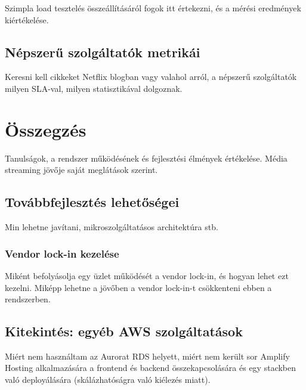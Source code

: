 Szimpla load tesztelés összeállításáról fogok itt értekezni, és a mérési eredmények kiértékelése.

\section{Népszerű szolgáltatók metrikái}

Keresni kell cikkeket Netflix blogban vagy valahol arról, a népszerű szolgáltatók milyen SLA-val, milyen statisztikával dolgoznak.

\chapter{Összegzés}

Tanulságok, a rendszer működésének és fejlesztési élmények értékelése. Média streaming jövője saját meglátások szerint.

\section{Továbbfejlesztés lehetőségei}

Min lehetne javítani, mikroszolgáltatásos architektúra stb.

\subsection{Vendor lock-in kezelése}

Miként befolyásolja egy üzlet működését a vendor lock-in, és hogyan lehet ezt kezelni. Miképp lehetne a jövőben a vendor lock-in-t csökkenteni ebben a rendszerben.

\section{Kitekintés: egyéb AWS szolgáltatások}

Miért nem használtam az Aurorat RDS helyett, miért nem került sor Amplify Hosting alkalmazására a frontend és backend összekapcsolására és egy stackben való deployálására (skálázhatóságra való kiélezés miatt).
